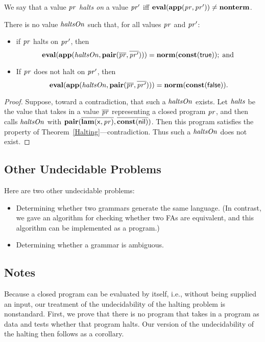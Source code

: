 We say that a value $\mathit{pr}$ \emph{halts on} a value $\mathit{pr}'$ iff
$\mathbf{eval}(\mathbf{app}(\mathit{pr},\mathit{pr}'))\neq\mathbf{nonterm}$.

\begin{corollary}
There is no value $\mathit{haltsOn}$ such that, for all values
$\mathit{pr}$ and $\mathit{pr}'$:
\begin{itemize}
\item if $\mathit{pr}$ halts on $\mathit{pr}'$, then
  \begin{displaymath}
    \mathbf{eval}(\mathbf{app}(\mathit{haltsOn},\mathbf{pair}(\overline{\mathit{pr}},\overline{\mathit{pr}'}))) =
    \mathbf{norm}(\mathbf{const}(\mathsf{true})) ; \;\allowbreak\mbox{and}\allowbreak\;
  \end{displaymath}

\item If $\mathit{pr}$ does not halt on $\mathit{pr}'$, then
  \begin{displaymath}
    \mathbf{eval}(\mathbf{app}(\mathit{haltsOn},\mathbf{pair}(\overline{\mathit{pr}},\overline{\mathit{pr}'}))) =
    \mathbf{norm}(\mathbf{const}(\mathsf{false})) .
  \end{displaymath}
\end{itemize}
\end{corollary}

\begin{proof}
Suppose, toward a contradiction, that such a $\mathit{haltsOn}$ exists.  Let
$\mathit{halts}$ be the value that takes in a value $\overline{\mathit{pr}}$
representing a closed program $\mathit{pr}$, and then calls $\mathit{haltsOn}$ with
$\mathbf{pair}(\overline{\mathbf{lam}(\mathsf{x},\mathit{pr})},\overline{\mathbf{const}(\mathsf{nil})})$.
Then this program satisfies the property of
Theorem~\ref{Halting}---contradiction.  Thus such a $\mathit{haltsOn}$ does
not exist.
\end{proof}

\subsection{Other Undecidable Problems}

Here are two other undecidable problems:
\begin{itemize}
\item Determining whether two grammars generate the same language.
(In contrast, we gave an algorithm for checking whether two FAs are
equivalent, and this algorithm can be implemented as a program.)

\item Determining whether a grammar is ambiguous.
\end{itemize}

\subsection{Notes}

Because a closed program can be evaluated by itself, i.e., without
being supplied an input, our treatment of the undecidability of
the halting problem is nonstandard.  First, we prove that there is
no program that takes in a program as data and tests whether that
program halts.  Our version of the undecidability of the halting
then follows as a corollary.

